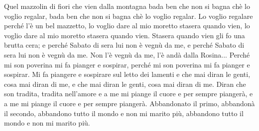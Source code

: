 \chordsoff
\beginverse
Quel mazzolin di fiori
che vien dalla montagna
bada ben che non si bagna
chè lo voglio regalar,
bada ben che non si bagna
chè lo voglio regalar.
\endverse
\beginverse
Lo voglio regalare
perché l'è un bel mazzetto,
lo voglio dare al mio moretto
stasera quando vien,
lo voglio dare al mio moretto
stasera quando vien.
\endverse
\beginverse
Stasera quando vien
gli fo una brutta cera;
e perché Sabato di sera
lui non è vegnù da me,
e perché Sabato di sera
lui non è vegnù da me.
\endverse
\beginverse
Non l'è vegnù da me,
l'è andà dalla Rosina...
Perché mi son poverina
mi fa pianger e sospirar,
perché mi son poverina
mi fa pianger e sospirar.
\endverse
\beginverse
Mi fa piangere e sospirare
sul letto dei lamenti
e che mai diran le genti,
cosa mai diran di me,
e che mai diran le genti,
cosa mai diran di me.
\endverse
\beginverse
Diran che son tradita,
tradita nell'amore
e a me mi piange il cuore
e per sempre piangerà,
e a me mi piange il cuore
e per sempre piangerà.
\endverse
\beginverse
Abbandonato il primo,
abbandonà il secondo,
abbandono tutto il mondo
e non mi marito più,
abbandono tutto il mondo
e non mi marito più. 
\endverse
\endsong




